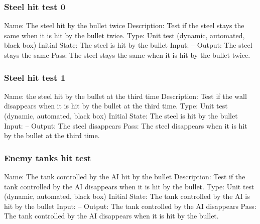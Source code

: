 \documentclass{article}
\begin{document}
\subsubsection{Steel hit test 0}
Name:  The steel hit by the bullet twice\newline
Description: Test if the steel stays the same when it is hit by the bullet 
twice. \newline
Type: Unit test (dynamic, automated, black box) \newline
Initial State:  The steel is hit by the bullet \newline
Input: --\newline
Output: The steel stays the same \newline
Pass:  The steel stays the same when it is hit by the bullet twice. \newline

\subsubsection{Steel hit test 1}
Name:  the steel hit by the bullet at the third time\newline
Description: Test if the wall disappears when it is hit by the bullet at the 
third time. \newline
Type: Unit test (dynamic, automated, black box) \newline
Initial State:  The steel is hit by the bullet \newline
Input: --\newline
Output: The steel disappears \newline
Pass:   The steel disappears when it is hit by the bullet at the third time. 
\newline


\subsubsection{Enemy tanks hit test}
Name:  The tank controlled by the AI hit by the bullet\newline
Description: Test if the tank controlled by the AI disappears when it is hit 
by the bullet. \newline
Type: Unit test (dynamic, automated, black box) \newline
Initial State:  The tank controlled by the AI is hit by the bullet \newline
Input: --\newline
Output: The tank controlled by the AI disappears \newline
Pass: The tank controlled by the AI disappears when it is hit by the bullet. 
\newline
\end{document}

